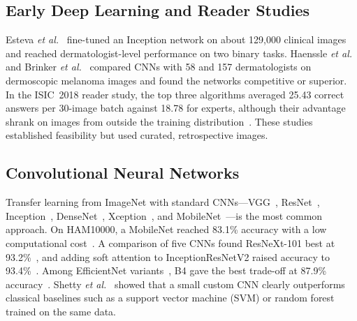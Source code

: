 \subsection{Early Deep Learning and Reader Studies}
Esteva \emph{et al.}~\cite{esteva2017derm} fine-tuned an Inception
network on about 129{,}000 clinical images and reached
dermatologist-level performance on two binary tasks. Haenssle
\emph{et al.}~\cite{haenssle2018man} and Brinker
\emph{et al.}~\cite{brinker2019deep} compared CNNs with 58 and 157
dermatologists on dermoscopic melanoma images and found the networks
competitive or superior. In the ISIC~2018 reader study, the top three
algorithms averaged 25.43 correct answers per 30-image batch against
18.78 for experts, although their advantage shrank on images from
outside the training distribution~\cite{tschandl2019comparison}. These
studies established feasibility but used curated, retrospective images.

\subsection{Convolutional Neural Networks}
Transfer learning from ImageNet with standard CNNs---VGG~\cite{simonyan2015vgg},
ResNet~\cite{he2016resnet}, Inception~\cite{szegedy2016inception},
DenseNet~\cite{huang2017densenet}, Xception~\cite{chollet2017xception},
and MobileNet~\cite{sandler2018mobilenetv2}---is the most common
approach. On HAM10000, a MobileNet reached 83.1\% accuracy with a low
computational cost~\cite{chaturvedi2020mobilenet}. A comparison of
five CNNs found ResNeXt-101 best at 93.2\%~\cite{chaturvedi2020mtap},
and adding soft attention to InceptionResNetV2 raised accuracy to
93.4\%~\cite{datta2021soft}. Among EfficientNet variants~\cite{tan2019efficientnet},
B4 gave the best trade-off at 87.9\% accuracy~\cite{ali2022efficientnets}.
Shetty \emph{et al.}~\cite{shetty2022} showed that a small custom CNN
clearly outperforms classical baselines such as a support vector
machine (SVM) or random forest trained on the same data.

